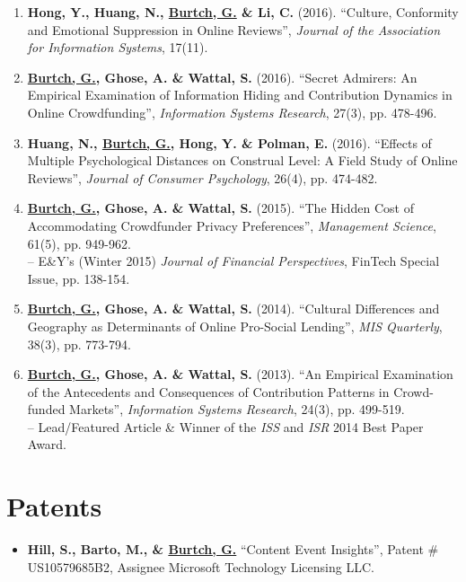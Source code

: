 \documentclass[10.5pt,letterpaper,sans]{moderncv}        %
\begin{document}
\begin{enumerate}[leftmargin=!,labelindent=5pt,itemindent=-15pt]
\item \textbf{Hong, Y., Huang, N., \underline{Burtch, G.} \& Li, C.} (2016). ``Culture, Conformity and Emotional Suppression in Online Reviews'', \textit{Journal of the Association for Information Systems}, 17(11).

\item \textbf{\underline{Burtch, G.}, Ghose, A. \& Wattal, S.} (2016). ``Secret Admirers: An Empirical Examination of Information Hiding and Contribution Dynamics in Online Crowdfunding'', \textit{Information Systems Research}, 27(3), pp. 478-496.

\item \textbf{Huang, N., \underline{Burtch, G.}, Hong, Y. \& Polman, E.} (2016). ``Effects of Multiple Psychological Distances on Construal Level: A Field Study of Online Reviews'', \textit{Journal of Consumer Psychology}, 26(4), pp. 474-482.

\item \textbf{\underline{Burtch, G.}, Ghose, A. \& Wattal, S.} (2015). ``The Hidden Cost of Accommodating Crowdfunder Privacy Preferences'', \textit{Management Science}, 61(5), pp. 949-962. \\-- E\&Y's (Winter 2015) \textit{Journal of Financial Perspectives}, FinTech Special Issue, pp. 138-154.

\item \textbf{\underline{Burtch, G.}, Ghose, A. \& Wattal, S.} (2014). ``Cultural Differences and Geography as Determinants of Online Pro-Social Lending'', \textit{MIS Quarterly}, 38(3), pp. 773-794.

\item \textbf{\underline{Burtch, G.}, Ghose, A. \& Wattal, S.} (2013). ``An Empirical Examination of the Antecedents and Consequences of Contribution Patterns in Crowd-funded Markets'', \textit{Information Systems Research}, 24(3), pp. 499-519. \\-- Lead/Featured Article \& Winner of the \textit{ISS} and \textit{ISR} 2014 Best Paper Award.

\end{enumerate}

\section{Patents}

\begin{itemize}[leftmargin=!,labelindent=5pt,itemindent=-15pt]

\item \textbf{Hill, S., Barto, M., \& \underline{Burtch, G.}} ``Content Event Insights'', Patent \# US10579685B2, Assignee\: Microsoft Technology Licensing LLC.

\end{itemize}
\end{document}
